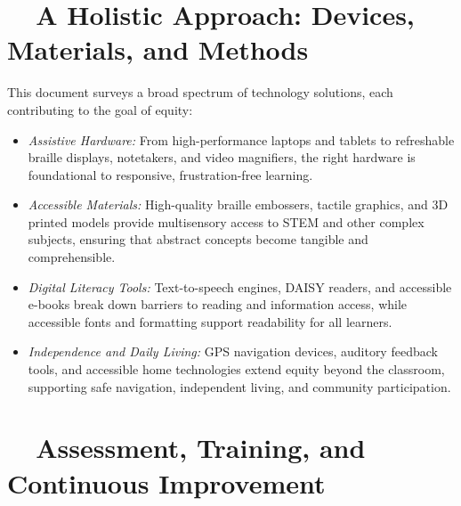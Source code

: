 \section{~~A Holistic Approach: Devices, Materials, and Methods}
\label{sec:intro-holistic-approach}

This document surveys a broad spectrum of \gls{technology} solutions, each contributing to the goal of equity:

\begin{itemize}
	\item \emph{Assistive Hardware:} From high-performance laptops and tablets to refreshable braille displays\supercite{FocusBlue, BrailliantBI40X}, notetakers\supercite{BrailleNoteTouchPlus32, BrailleSense6}, and video magnifiers\supercite{PerkinsVideoMagnifier}, the right hardware is foundational to responsive, frustration-free learning.
	\item \emph{Accessible Materials:} High-quality braille embossers\supercite{IrieBrailleTrac}, tactile graphics\supercite{CreatingTactileGraphics, TactileView}, and 3D printed models\supercite{See3D, Karbowski2020} provide multisensory access to STEM and other complex subjects, ensuring that abstract concepts become tangible and comprehensible.
	\item \emph{Digital Literacy Tools:} Text-to-speech engines\supercite{VisionAid2025}, DAISY readers\supercite{DAISY2024}, and accessible e-books\supercite{Bookshare} break down barriers to reading and information access, while accessible fonts\supercite{AccessiBeFonts, HubSpotFonts} and formatting support readability for all learners.
	\item \emph{Independence and Daily Living:} GPS navigation devices\supercite{AFBGPS2023}, auditory feedback tools\supercite{ABlindLegend}, and accessible home technologies\supercite{AllAboutVision2023} extend equity beyond the classroom, supporting safe navigation, independent living, and community participation.
\end{itemize}

\section{~~Assessment, Training, and Continuous Improvement}
\label{sec:intro-assessment-training}

